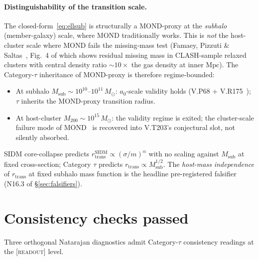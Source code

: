 \documentclass{pantarhei-researchnote}
\newcommand{\aMOND}{a_0}                        %
\newcommand{\Msub}{M_{\mathrm{sub}}}
\newcommand{\Mtwohun}{M_{200}}
\newcommand{\Mpc}{\mathrm{Mpc}}
\newcommand{\Msun}{M_{\odot}}
\newcommand{\rtran}{r_{\mathrm{trans}}}
\newcommand{\readout}{\textsc{[readout]}}
\newcommand{\falsifierID}[1]{\textsc{N16.#1}}
\begin{document}
\paragraph{Distinguishability of the transition scale.}
The closed-form~\eqref{eq:ellsub} is structurally a MOND-proxy at the
\emph{subhalo} (member-galaxy) scale, where MOND traditionally works.
This is \emph{not} the host-cluster scale where MOND fails the
missing-mass test (Famaey, Pizzuti \& Saltas~\cite{Famaey2025},
Fig.~4 of which shows residual missing mass in CLASH-sample relaxed
clusters with central density ratio $\sim 10\times$ the gas density at
inner $\Mpc$). The Category-$\tau$ inheritance of MOND-proxy is therefore
regime-bounded:
\begin{itemize}[leftmargin=1.4em,nosep]
  \item At subhalo $\Msub \sim 10^{10}$--$10^{11}\,\Msun$:
        $\aMOND$-scale validity holds (V.P68 + V.R175~\cite{KSZCategorical}); $\tau$ inherits the MOND-proxy
        transition radius.
  \item At host-cluster $\Mtwohun \sim 10^{15}\,\Msun$:
        the validity regime is exited; the cluster-scale failure mode
        of MOND~\cite{Famaey2025} is recovered into V.T203's
        conjectural slot, not silently absorbed.
\end{itemize}
\noindent
SIDM core-collapse predicts $r_{\mathrm{trans}}^{\mathrm{SIDM}} \propto
(\sigma/m)^{\alpha}$ with no scaling against $\Msub$ at fixed cross-section;
Category $\tau$ predicts $\rtran \propto \Msub^{1/2}$. The
\emph{host-mass independence} of $\rtran$ at fixed subhalo mass function
is the headline pre-registered falsifier (\falsifierID{3} of
\S\ref{sec:falsifiers}).


\section{Consistency checks passed}\label{sec:consistency}

Three orthogonal Natarajan diagnostics admit Category-$\tau$ consistency
readings at the \readout{} level.
\end{document}
